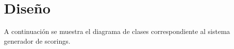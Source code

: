 \section{Diseño}

A continuación se muestra el diagrama de clases correspondiente al sistema generador 
de scorings.




